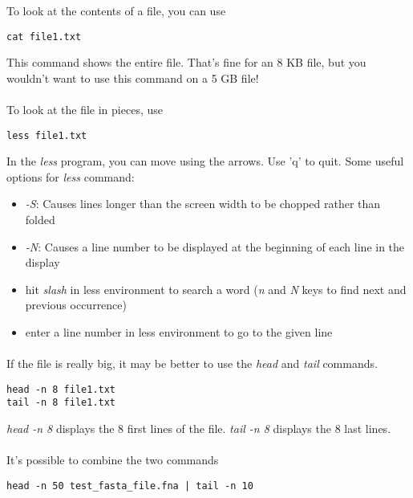 \documentclass[two_sides]{my_article}
\begin{document}
To look at the contents of a file, you can use

\begin{lstlisting}[frame=lines, numbers=none]
cat file1.txt
\end{lstlisting}

This command shows the entire file. That’s fine for an 8 KB file, but you wouldn’t want
to use this command on a 5 GB file!
\paragraph{}
To  look at the file in pieces, use

\begin{lstlisting}[frame=lines, numbers=none]
less file1.txt
\end{lstlisting}

In the \emph{less} program, you can move using the arrows. Use 'q' to quit. Some useful options for \emph{less} command:
\begin{itemize}
\item \emph{-S}: Causes lines longer than the screen width to be chopped rather than folded
\item \emph{-N}: Causes a line number to be displayed at the beginning of each line in the display
\item hit \emph{slash} in less environment to search a word (\emph{n} and \emph{N} keys to find next and previous occurrence)
\item enter a line number in less environment to go to the given line
\end{itemize}
\paragraph{}
If the file is really big, it may be better to use the \emph{head} and \emph{tail} commands.

\begin{lstlisting}[frame=lines, numbers=none]
head -n 8 file1.txt
tail -n 8 file1.txt
\end{lstlisting}

\emph{head -n 8} displays the 8 first lines of the file. \emph{tail -n 8} displays the 8 last lines.
\paragraph{}
It's possible to combine the two commands

\begin{lstlisting}[frame=lines, numbers=none]
head -n 50 test_fasta_file.fna | tail -n 10
\end{lstlisting}
\end{document}
